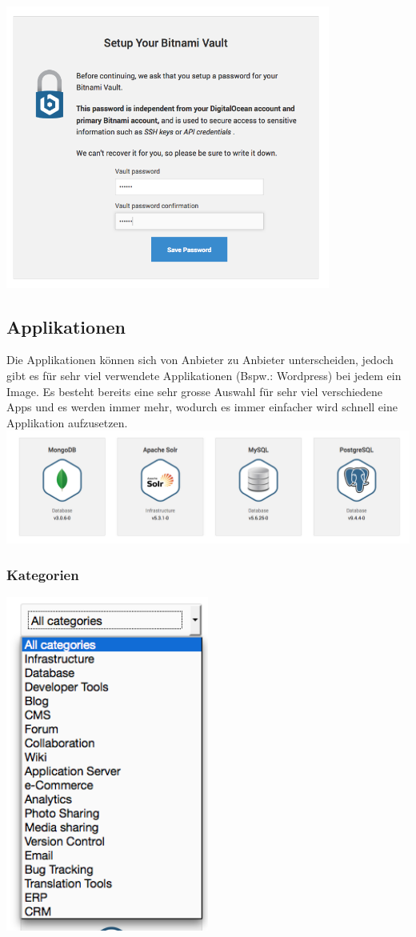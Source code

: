 \documentclass[11pt]{scrartcl}
\begin{document}
\includegraphics[width=0.8\textwidth]{bitnami_security}

\subsection{Applikationen}
Die Applikationen können sich von Anbieter zu Anbieter unterscheiden, jedoch 
gibt es für sehr viel verwendete Applikationen (Bspw.: Wordpress) bei jedem ein 
Image.
Es besteht bereits eine sehr grosse Auswahl für sehr viel verschiedene Apps und 
es werden immer mehr, wodurch es immer einfacher wird schnell eine Applikation 
aufzusetzen.
\includegraphics[width=\textwidth]{apps}

\subsubsection{Kategorien}
\includegraphics[width=0.5\textwidth]{categories}
\end{document}
